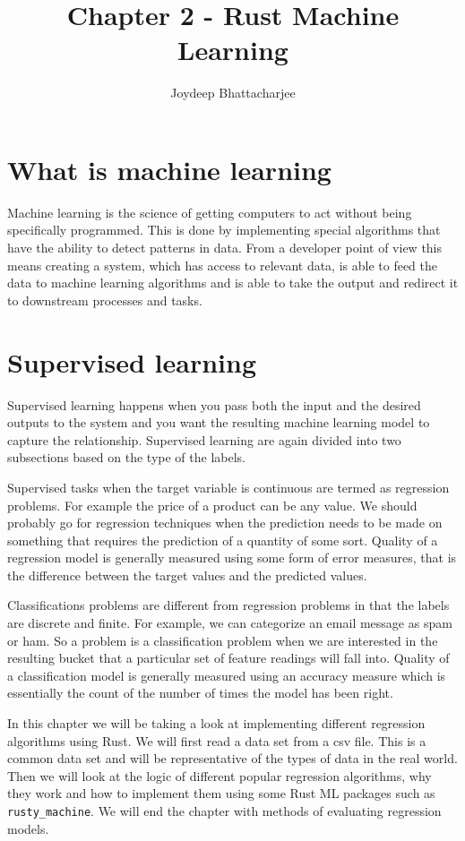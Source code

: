 \documentclass{book}
\begin{document}
\title{Chapter 2 - Rust Machine Learning}
\author {Joydeep Bhattacharjee}

\maketitle

\section{What is machine learning}
Machine learning is the science of getting computers to act without being specifically programmed. This is done by implementing special algorithms that have the ability to detect patterns in data. From a developer point of view this means creating a system, which has access to relevant data, is able to feed the data to machine learning algorithms and is able to take the output and redirect it to downstream processes and tasks.

\section{Supervised learning}%

Supervised learning happens when you pass both the input and the desired outputs to the system and you want the resulting machine learning model to capture the relationship. Supervised learning are again divided into two subsections based on the type of the labels.

Supervised tasks when the target variable is continuous are termed as regression problems. For example the price of a product can be any value. We should probably go for regression techniques when the prediction needs to be made on something that requires the prediction of a quantity of some sort. Quality of a regression model is generally measured using some form of error measures, that is the difference between the target values and the predicted values.

Classifications problems are different from regression problems in that the labels are discrete and finite. For example, we can categorize an email message as spam or ham. So a problem is a classification problem when we are interested in the resulting bucket that a particular set of feature readings will fall into. Quality of a classification model is generally measured using an accuracy measure which is essentially the count of the number of times the model has been right.

In this chapter we will be taking a look at implementing different regression algorithms using Rust. We will first read a data set from a csv file. This is a common data set and will be representative of the types of data in the real world. Then we will look at the logic of different popular regression algorithms, why they work and how to implement them using some Rust ML packages such as \lstinline{rusty_machine}. We will end the chapter with methods of evaluating regression models.
\end{document}
